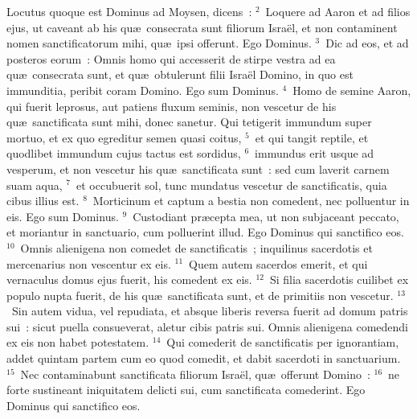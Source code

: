 \lettrine[lines=3,image=true,loversize=0.05,lraise=-0.03]{L}{}ocutus quoque est Dominus ad Moysen, dicens~:
${}^{2}$~Loquere ad Aaron et ad filios ejus, ut caveant ab his qu\ae\ consecrata sunt filiorum Isra\"el, et non contaminent nomen sanctificatorum mihi, qu\ae\ ipsi offerunt. Ego Dominus.
${}^{3}$~Dic ad eos, et ad posteros eorum~: Omnis homo qui accesserit de stirpe vestra ad ea qu\ae\ consecrata sunt, et qu\ae\ obtulerunt filii Isra\"el Domino, in quo est immunditia, peribit coram Domino. Ego sum Dominus.
${}^{4}$~Homo de semine Aaron, qui fuerit leprosus, aut patiens fluxum seminis, non vescetur de his qu\ae\ sanctificata sunt mihi, donec sanetur. Qui tetigerit immundum super mortuo, et ex quo egreditur semen quasi coitus,
${}^{5}$~et qui tangit reptile, et quodlibet immundum cujus tactus est sordidus,
${}^{6}$~immundus erit usque ad vesperum, et non vescetur his qu\ae\ sanctificata sunt~: sed cum laverit carnem suam aqua,
${}^{7}$~et occubuerit sol, tunc mundatus vescetur de sanctificatis, quia cibus illius est.
${}^{8}$~Morticinum et captum a bestia non comedent, nec polluentur in eis. Ego sum Dominus.
${}^{9}$~Custodiant pr\ae cepta mea, ut non subjaceant peccato, et moriantur in sanctuario, cum polluerint illud. Ego Dominus qui sanctifico eos.
${}^{10}$~Omnis alienigena non comedet de sanctificatis~; inquilinus sacerdotis et mercenarius non vescentur ex eis.
${}^{11}$~Quem autem sacerdos emerit, et qui vernaculus domus ejus fuerit, his comedent ex eis.
${}^{12}$~Si filia sacerdotis cuilibet ex populo nupta fuerit, de his qu\ae\ sanctificata sunt, et de primitiis non vescetur.
${}^{13}$~Sin autem vidua, vel repudiata, et absque liberis reversa fuerit ad domum patris sui~: sicut puella consueverat, aletur cibis patris sui. Omnis alienigena comedendi ex eis non habet potestatem.
${}^{14}$~Qui comederit de sanctificatis per ignorantiam, addet quintam partem cum eo quod comedit, et dabit sacerdoti in sanctuarium.
${}^{15}$~Nec contaminabunt sanctificata filiorum Isra\"el, qu\ae\ offerunt Domino~:
${}^{16}$~ne forte sustineant iniquitatem delicti sui, cum sanctificata comederint. Ego Dominus qui sanctifico eos.


